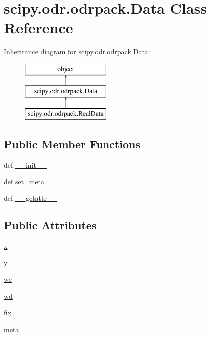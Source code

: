 \hypertarget{classscipy_1_1odr_1_1odrpack_1_1Data}{}\section{scipy.\+odr.\+odrpack.\+Data Class Reference}
\label{classscipy_1_1odr_1_1odrpack_1_1Data}
Inheritance diagram for scipy.\+odr.\+odrpack.\+Data\+:\begin{figure}[H]
\begin{center}
\leavevmode
\includegraphics[height=3.000000cm]{classscipy_1_1odr_1_1odrpack_1_1Data}
\end{center}
\end{figure}
\subsection*{Public Member Functions}
\begin{DoxyCompactItemize}
\item 
def \hyperlink{classscipy_1_1odr_1_1odrpack_1_1Data_a35306ddd79f29d59cf5ced315f3ef0bd}{\+\_\+\+\_\+init\+\_\+\+\_\+}
\item 
def \hyperlink{classscipy_1_1odr_1_1odrpack_1_1Data_a7895a3d9d8a73158d4d7a0beadce1644}{set\+\_\+meta}
\item 
def \hyperlink{classscipy_1_1odr_1_1odrpack_1_1Data_a7d9ee1d45768849adcec8f3930cbe49f}{\+\_\+\+\_\+getattr\+\_\+\+\_\+}
\end{DoxyCompactItemize}
\subsection*{Public Attributes}
\begin{DoxyCompactItemize}
\item 
\hyperlink{classscipy_1_1odr_1_1odrpack_1_1Data_a8be6f83ceeac7832a691aa050c861ecd}{x}
\item 
\hyperlink{classscipy_1_1odr_1_1odrpack_1_1Data_a552d99ca532d3351ada6e84ffde9fe53}{y}
\item 
\hyperlink{classscipy_1_1odr_1_1odrpack_1_1Data_aba677c7f1c684326b12b920f62f34a37}{we}
\item 
\hyperlink{classscipy_1_1odr_1_1odrpack_1_1Data_a621ccbbaea7977020d7eabc40adfd0a5}{wd}
\item 
\hyperlink{classscipy_1_1odr_1_1odrpack_1_1Data_aed98ff89f22fa65cf045a06e757cc753}{fix}
\item 
\hyperlink{classscipy_1_1odr_1_1odrpack_1_1Data_aeb7c2e5ead57779d186665409bd02c58}{meta}
\end{DoxyCompactItemize}


